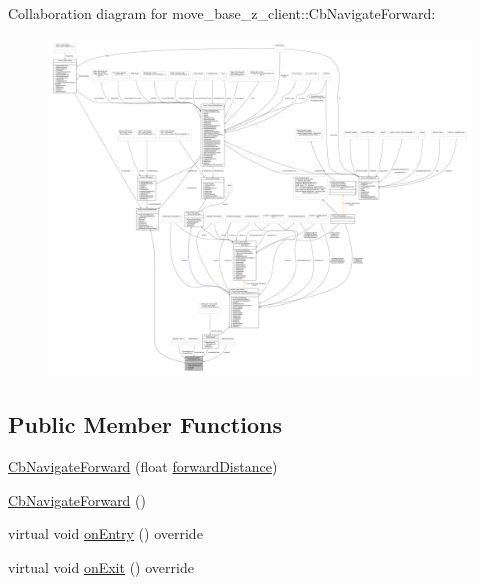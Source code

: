 Collaboration diagram for move\+\_\+base\+\_\+z\+\_\+client\+:\+:Cb\+Navigate\+Forward\+:
\nopagebreak
\begin{figure}[H]
\begin{center}
\leavevmode
\includegraphics[width=350pt]{classmove__base__z__client_1_1CbNavigateForward__coll__graph}
\end{center}
\end{figure}
\subsection*{Public Member Functions}
\begin{DoxyCompactItemize}
\item 
\hyperlink{classmove__base__z__client_1_1CbNavigateForward_a14f25162a57acb3d0a0e693ec77b08b7}{Cb\+Navigate\+Forward} (float \hyperlink{classmove__base__z__client_1_1CbNavigateForward_ab3097d686b5a82b4f650bc5175d8ab73}{forward\+Distance})
\item 
\hyperlink{classmove__base__z__client_1_1CbNavigateForward_a9acd20b586f4b5892af7e01d8ddf309c}{Cb\+Navigate\+Forward} ()
\item 
virtual void \hyperlink{classmove__base__z__client_1_1CbNavigateForward_a48df166608fd30ad6abfd0fca43caa51}{on\+Entry} () override
\item 
virtual void \hyperlink{classmove__base__z__client_1_1CbNavigateForward_aa0f004dd176ca62dfddb836a52aa4376}{on\+Exit} () override
\end{DoxyCompactItemize}
